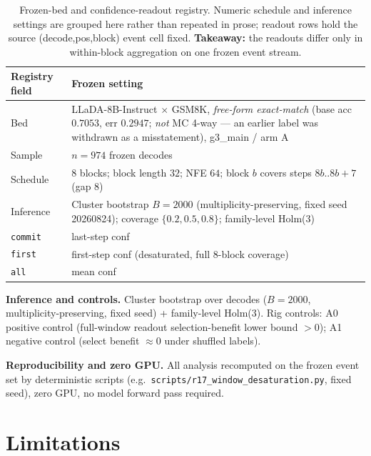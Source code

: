\documentclass{article}
\begin{document}
\begin{table}[!htbp]
  \caption{Frozen-bed and confidence-readout registry. Numeric schedule and inference
  settings are grouped here rather than repeated in prose; readout rows hold the source
  (decode,pos,block) event cell fixed. \textbf{Takeaway:} the readouts differ only in
  within-block aggregation on one frozen event stream.}
  \label{tab:readouts}
  \centering
  \small
  \begin{tabular}{@{}p{}p{}@{}}
    \toprule
    Registry field & Frozen setting \\
    \midrule
    Bed & LLaDA-8B-Instruct $\times$ GSM8K, \emph{free-form exact-match} (base acc
    $0.7053$, err $0.2947$; \emph{not} MC 4-way --- an earlier label was withdrawn as a
    misstatement), g3\_main / arm A \\
    Sample & $n{=}974$ frozen decodes \\
    Schedule & 8 blocks; block length $32$; NFE $64$; block $b$ covers steps
    $8b..8b{+}7$ (gap $8$) \\
    Inference & Cluster bootstrap $B{=}2000$ (multiplicity-preserving, fixed seed
    20260824); coverage $\{0.2,0.5,0.8\}$; family-level Holm(3) \\
    \texttt{commit} & last-step conf \\
    \texttt{first} & first-step conf (desaturated, full 8-block coverage) \\
    \texttt{all} & mean conf \\
    \bottomrule
  \end{tabular}
\end{table}
\textbf{Inference and controls.} Cluster bootstrap over decodes ($B{=}2000$,
multiplicity-preserving, fixed seed) + family-level Holm(3). Rig controls: A0 positive
control (full-window readout selection-benefit lower bound $>0$); A1 negative control
(select benefit $\approx 0$ under shuffled labels).

\textbf{Reproducibility and zero GPU.} All analysis recomputed on the frozen event set by
deterministic scripts (e.g.\ \texttt{scripts/r17\_window\_desaturation.py}, fixed seed),
zero GPU, no model forward pass required.

\section{Limitations}
\label{sec:limits}
\end{document}
